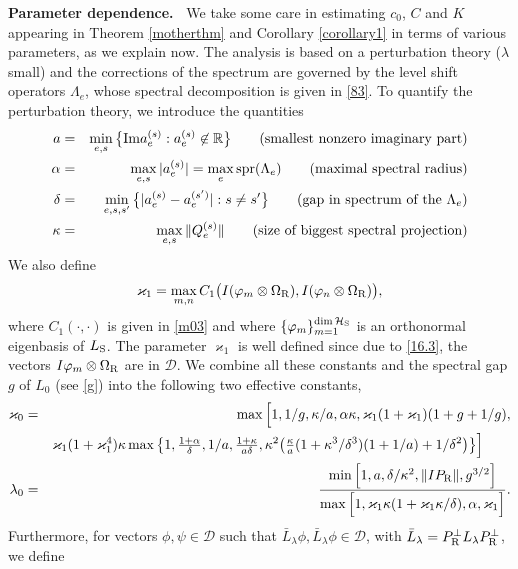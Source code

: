 \documentclass[letterpaper,onecolumn,11pt,accepted=2021-12-09]{quantumarticle}
\numberwithin{equation}{section}
\newcommand{\aes}{a_e^{(s)}}
\newcommand{\Qes}{Q_e^{(s)}}
\renewcommand{\r}{{\rm R}}
\newcommand{\s}{{\rm S}}
\begin{document}
{\bf Parameter dependence.\ } We take some care in estimating $c_0$, $C$ and $K$ appearing in Theorem \ref{motherthm} and Corollary \ref{corollary1} in terms of various parameters, as we explain now. The analysis is based on a perturbation theory ($\lambda$ small) and the corrections of the spectrum are governed by the level shift operators $\Lambda_e$, whose spectral decomposition is given in \eqref{83}. To quantify the perturbation theory, we  introduce the quantities
\begin{eqnarray}
a&=& \min_{e,s}\big\{ {\rm Im}\aes : \aes\not\in{\mathbb R} \big\}  \qquad \mbox{(smallest nonzero imaginary part)}\label{FGR}\\
\alpha&=&  \max_{e,s} |\aes| = \max_e {\rm spr}(\Lambda_e)\qquad \mbox{(maximal spectral radius)}\label{alpha}\\
\delta&=&	\min_{e, s,s'}\big\{|a_e^{(s)} -a_e^{(s')}| : s\neq s'\big\}  \label{delta} \qquad \mbox{(gap in spectrum of the  $\Lambda_e$)}\\
\kappa&=& 	\max_{e,s} \|\Qes\|\qquad \mbox{(size of biggest spectral projection)}
\label{kappa}
\end{eqnarray}
We also define 
\begin{equation}
\label{195.1}
\varkappa_1 = \max_{m,n} C_1\big(I(\varphi_m\otimes\Omega_\r), I(\varphi_n\otimes\Omega_\r)\big),
\end{equation}
where $C_1(\cdot,\cdot)$ is given in \eqref{m03} and where $\{\varphi_m\}_{m=1}^{\dim {\mathcal H}_\s}$ is an orthonormal eigenbasis of $L_\s$. The parameter $\varkappa_1$ is well defined since due to \eqref{16.3}, the vectors $I \varphi_m\otimes\Omega_\r$ are in $\mathcal D$. We combine all these constants and the spectral gap $g$ of $L_0$ (see  \eqref{g}) into the following two effective constants, 
\begin{eqnarray}
\varkappa_0&=&
		\max\Big[1, 1/g,\kappa/a,\alpha\kappa,\varkappa_1(1+\varkappa_1)(1+g+1/g),\nonumber\\
		&&\varkappa_1(1+\varkappa_1^4)\kappa \max\big\{ 1,\tfrac{1+\alpha}{\delta}, 1/a, \tfrac{1+\kappa}{a\delta}, \kappa^2\big( \tfrac{\kappa}{a}(1+\kappa^3/\delta^3)(1+1/a)+1/\delta^2
		\big)\big\}\Big] \qquad
 \label{160.1.1}\\
 \lambda_0 &=& \frac{\min\Big[ 1,a,\delta/\kappa^2, \|I P_\r\|, g^{3/2}\Big]}{\max\Big[ 1, \varkappa_1\kappa (1+\varkappa_1\kappa/\delta), \alpha,\varkappa_1\Big]}.
 \label{lambdanot}
\end{eqnarray}
Furthermore, for vectors $\phi,\psi\in{\mathcal D}$ such that $\bar L_\lambda \phi, \bar L_\lambda\phi\in{\mathcal D}$, with $\bar L_\lambda=P^\perp_\r L_\lambda P^\perp_\r$, we define
\end{document}
